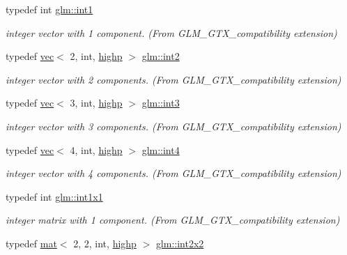 \begin{DoxyCompactItemize}
typedef int \hyperlink{group__gtx__compatibility_gaba41d7803e4b24c17656d74377b88286}{glm\+::int1}
\begin{DoxyCompactList}\small\item\em integer vector with 1 component. (From G\+L\+M\+\_\+\+G\+T\+X\+\_\+compatibility extension) \end{DoxyCompactList}\item 
typedef \hyperlink{structglm_1_1vec}{vec}$<$ 2, int, \hyperlink{namespaceglm_a36ed105b07c7746804d7fdc7cc90ff25ac6f7eab42eacbb10d59a58e95e362074}{highp} $>$ \hyperlink{group__gtx__compatibility_ga3a3a6007d7619dee4f6c425fe7ac24eb}{glm\+::int2}
\begin{DoxyCompactList}\small\item\em integer vector with 2 components. (From G\+L\+M\+\_\+\+G\+T\+X\+\_\+compatibility extension) \end{DoxyCompactList}\item 
typedef \hyperlink{structglm_1_1vec}{vec}$<$ 3, int, \hyperlink{namespaceglm_a36ed105b07c7746804d7fdc7cc90ff25ac6f7eab42eacbb10d59a58e95e362074}{highp} $>$ \hyperlink{group__gtx__compatibility_ga90dda63e632aac169a8796ac06ff9de2}{glm\+::int3}
\begin{DoxyCompactList}\small\item\em integer vector with 3 components. (From G\+L\+M\+\_\+\+G\+T\+X\+\_\+compatibility extension) \end{DoxyCompactList}\item 
typedef \hyperlink{structglm_1_1vec}{vec}$<$ 4, int, \hyperlink{namespaceglm_a36ed105b07c7746804d7fdc7cc90ff25ac6f7eab42eacbb10d59a58e95e362074}{highp} $>$ \hyperlink{group__gtx__compatibility_ga19f0c43f626567ad3ca888b8ad0d0093}{glm\+::int4}
\begin{DoxyCompactList}\small\item\em integer vector with 4 components. (From G\+L\+M\+\_\+\+G\+T\+X\+\_\+compatibility extension) \end{DoxyCompactList}\item 
typedef int \hyperlink{group__gtx__compatibility_ga09016a637a3cd093c22e6188080ac750}{glm\+::int1x1}
\begin{DoxyCompactList}\small\item\em integer matrix with 1 component. (From G\+L\+M\+\_\+\+G\+T\+X\+\_\+compatibility extension) \end{DoxyCompactList}\item 
typedef \hyperlink{structglm_1_1mat}{mat}$<$ 2, 2, int, \hyperlink{namespaceglm_a36ed105b07c7746804d7fdc7cc90ff25ac6f7eab42eacbb10d59a58e95e362074}{highp} $>$ \hyperlink{group__gtx__compatibility_ga8884c82366cc406dd20e00b78969d001}{glm\+::int2x2}

\end{DoxyCompactItemize}
